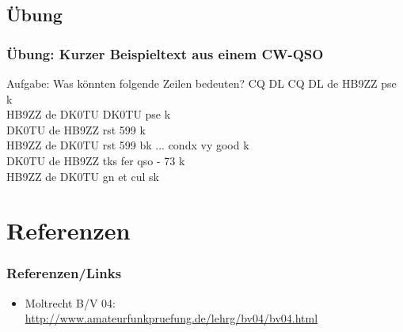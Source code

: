 \subsection*{Übung}
\begin{frame}
    \frametitle{Übung: Kurzer Beispieltext aus einem CW-QSO}

    \begin{block}{Aufgabe: Was könnten folgende Zeilen bedeuten?}
        CQ DL CQ DL de HB9ZZ pse k \\
        HB9ZZ de DK0TU DK0TU pse k \\
        DK0TU de HB9ZZ rst 599 k\\
        HB9ZZ de DK0TU rst 599 bk ... condx vy good k \\
        DK0TU de HB9ZZ tks fer qso - 73 k \\
        HB9ZZ de DK0TU gn et cul sk \\
    \end{block}

\end{frame}

\section*{Referenzen}

\begin{frame}
    \frametitle{Referenzen/Links}
    
    \footnotesize
    \begin{itemize}
        \item Moltrecht B/V 04: \\
              \url{http://www.amateurfunkpruefung.de/lehrg/bv04/bv04.html}
    \end{itemize}

\end{frame}


